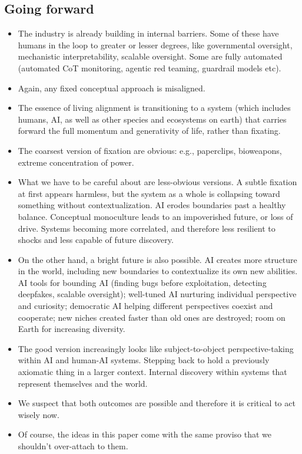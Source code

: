 \documentclass[11pt]{article}
\begin{document}
\subsection*{Going forward}

\begin{itemize}
  \item The industry is already building in internal barriers. Some of these have humans in the loop to greater or lesser degrees, like governmental oversight, mechanistic interpretability, scalable oversight. Some are fully automated (automated CoT monitoring, agentic red teaming, guardrail models etc). 
  \item Again, any fixed conceptual approach is misaligned. 
  \item The essence of living alignment is transitioning to a system (which includes humans, AI, as well as other species and ecosystems on earth) that carries forward the full momentum and generativity of life, rather than fixating. 
  \item The coarsest version of fixation are obvious: e.g., paperclips, bioweapons, extreme concentration of power.
  \item What we have to be careful about are less-obvious versions. A subtle fixation at first appears harmless, but the system as a whole is collapsing toward something without contextualization. AI erodes boundaries past a healthy balance. Conceptual monoculture leads to an impoverished future, or loss of drive. Systems becoming more correlated, and therefore less resilient to shocks and less capable of future discovery. 
  \item On the other hand, a bright future is also possible. AI creates more structure in the world, including new boundaries to contextualize its own new abilities. AI tools for bounding AI (finding bugs before exploitation, detecting deepfakes, scalable oversight); well-tuned AI nurturing individual perspective and curiosity; democratic AI helping different perspectives coexist and cooperate; new niches created faster than old ones are destroyed; room on Earth for increasing diversity.
  \item The good version increasingly looks like subject-to-object perspective-taking within AI and human-AI systems. Stepping back to hold a previously axiomatic thing in a larger context. Internal discovery within systems that represent themselves and the world.
  \item We suspect that both outcomes are possible and therefore it is critical to act wisely now.
  \item Of course, the ideas in this paper come with the same proviso that we shouldn't over-attach to them.

\end{itemize}
\end{document}
